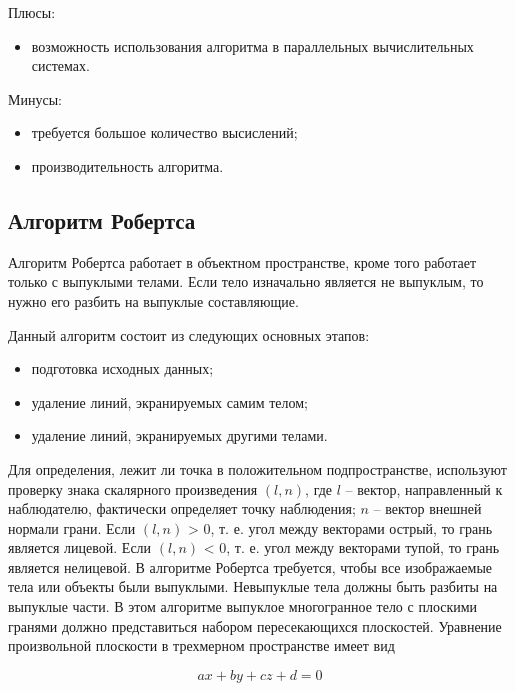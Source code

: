 Плюсы:

\begin{itemize}
	\item возможность использования алгоритма в параллельных вычислительных системах.
\end{itemize}

Минусы:

\begin{itemize}
	\item требуется большое количество высислений;
	\item производительность алгоритма.
\end{itemize}

\subsection{Алгоритм Робертса}

Алгоритм Робертса работает в объектном пространстве, кроме того работает только с выпуклыми телами. Если тело изначально является не выпуклым, то нужно его разбить на выпуклые составляющие.

Данный алгоритм состоит из следующих основных этапов:

\begin{itemize}
	\item подготовка исходных данных;
	\item удаление линий, экранируемых самим телом;
	\item удаление линий, экранируемых другими телами.
\end{itemize}


Для определения, лежит ли точка в положительном подпространстве, используют проверку знака скалярного произведения $(l, n)$, где $l$ – вектор, направленный к наблюдателю, фактически определяет точку наблюдения; $n$ – вектор внешней нормали грани. Если $(l, n)$ > 0, т. е. угол между векторами острый, то грань является лицевой. Если $(l, n)$ < 0, т. е. угол между векторами тупой, то грань является нелицевой.
В алгоритме Робертса требуется, чтобы все изображаемые тела или объекты были выпуклыми. Невыпуклые тела должны быть разбиты на выпуклые части. В этом алгоритме выпуклое многогранное тело с плоскими гранями должно представиться набором пересекающихся плоскостей. Уравнение произвольной плоскости в трехмерном пространстве имеет вид

\begin{equation}
	ax+by+cz+d = 0
\end{equation}

